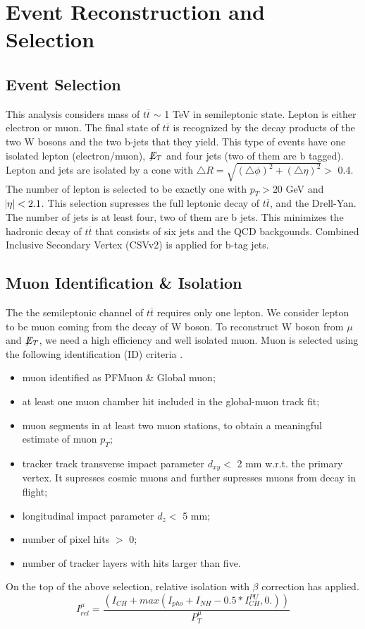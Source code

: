 \documentclass{cmspaper}
\begin{document}
\section{Event Reconstruction and Selection}
\subsection{Event Selection}
This analysis considers mass of $t\overline{t}$ $\sim$ 1 TeV in semileptonic state. Lepton is either electron or muon. The final state of $t\overline{t}$ is recognized by the decay products of the two W bosons and the two b-jets that they yield. This type of events have one isolated lepton (electron/muon), $\not\mathrel{E}_{T}$ and four jets (two of them are b tagged). Lepton and jets are isolated by a cone with $\triangle R = \sqrt{(\triangle \phi)^2 + (\triangle \eta)^2} >$ 0.4.\\
The number of lepton is selected to be exactly one with $p_{T} > 20$ GeV and $\abs {\eta} < 2.1$. This selection supresses the full leptonic decay of $t\overline{t}$, and the Drell-Yan. The number of jets is at least four, two of them are b jets. This minimizes the hadronic decay of $t\overline{t}$ that consists of six jets and the QCD backgounds. Combined Inclusive Secondary Vertex (CSVv2) is applied for b-tag jets.
\subsection{Muon Identification \& Isolation}
The the semileptonic channel of $t\overline{t}$ requires only one lepton. We consider lepton to be muon coming from the decay of W boson. To reconstruct W boson from $\mu$ and $\not\mathrel{E}_{T}$, we need a high efficiency and well isolated muon. Muon is selected using the following identification (ID) criteria \cite{muonid}.
\begin{itemize}
\item muon identified as PFMuon \& Global muon;
\item at least one muon chamber hit included in the global-muon track fit;
\item muon segments in at least two muon stations, to obtain a meaningful estimate of muon $p_{T}$;
\item tracker track transverse impact parameter $d_{xy} <$ 2 mm w.r.t. the primary vertex. It supresses cosmic muons and further supresses muons from decay in flight;
\item longitudinal impact parameter $d_{z} <$ 5 mm;
\item number of pixel hits $>$ 0;
\item number of tracker layers with hits larger than five.
\end{itemize}
On the top of the above selection, relative isolation with $\beta$ correction has applied. 
\begin{equation}
I^{\mu}_{rel} = \frac{(I_{CH} + max(I_{pho}+I_{NH} - 0.5*I_{CH}^{PU},0.))}{P^{\mu}_{T}}
\end{equation}
\end{document}
